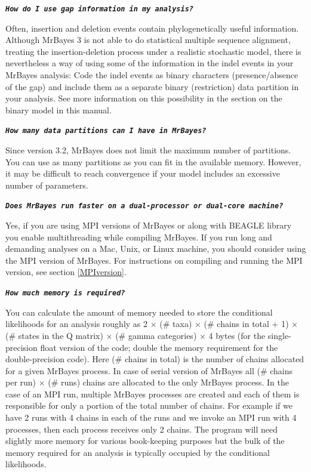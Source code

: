 \documentclass[12pt]{book}
\newcommand{\ttt}[1]{\texttt{#1}}
\newcommand{\tb}[1]{\ttt{\textbf{#1}}}
\begin{document}
\tb{\it{How do I use gap information in my analysis?}}

Often, insertion and deletion events contain phylogenetically useful information. Although MrBayes
3 is not able to do statistical multiple sequence alignment, treating the insertion-deletion
process under a realistic stochastic model, there is nevertheless a way of using some of the
information in the indel events in your MrBayes analysis: Code the indel events as binary
characters (presence/absence of the gap) and include them as a separate binary (restriction) data
partition in your analysis. See more information on this possibility in the section on the binary
model in this manual.

\tb{\it{How many data partitions can I have in MrBayes?}}

Since version 3.2, MrBayes does not limit the maximum number of partitions. You can use as many
partitions as you can fit in the available memory. However, it may be difficult to reach
convergence if your model includes an excessive number of parameters.

\tb{\it{Does MrBayes run faster on a dual-processor or dual-core machine?}}

Yes, if you are using MPI versions of MrBayes or along with BEAGLE library you enable
multithreading while compiling MrBayes. If you run long and demanding analyses on a Mac, Unix, or
Linux machine, you should consider using the MPI version of MrBayes. For instructions on compiling
and running the MPI version, see section \ref{MPIversion}.

\tb{\it{How much memory is required?}}

You can calculate the amount of memory needed to store the conditional likelihoods for an analysis
roughly as 2 $\times$ (\# taxa) $\times$ (\# chains in total + 1) $\times$ (\# states in the Q
matrix) $\times$ (\# gamma categories) $\times$ 4 bytes (for the single-precision float version of
the code; double the memory requirement for the double-precision code). Here (\# chains in total)
is the number of chains allocated for a given MrBayes process. In case of serial version of MrBayes
all (\# chains per run) $\times$ (\# runs) chains are allocated to the only MrBayes process. In the
case of an MPI run, multiple MrBayes processes are created and each of them is responsible for only
a portion of the total number of chains. For example if we have 2 runs with 4 chains in each of the
runs and we invoke an MPI run with 4 processes, then each process receives only 2 chains. The
program will need slightly more memory for various book-keeping purposes but the bulk of the memory
required for an analysis is typically occupied by the conditional likelihoods.
\end{document}
